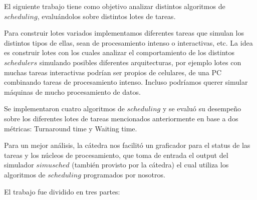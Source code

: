 El siguiente trabajo tiene como objetivo analizar distintos algoritmos de $scheduling$, evaluándolos sobre distintos lotes de tareas. 

Para construir lotes variados implementamos diferentes tareas que simulan los distintos tipos de ellas, sean de procesamiento intenso o interactivas, etc. La idea es construir lotes con los cuales analizar el comportamiento de los distintos $schedulers$ simulando posibles diferentes arquitecturas, por ejemplo lotes con muchas tareas interactivas podrían ser propios de celulares, de una PC combinando tareas de procesamiento intenso. Incluso podríamos querer simular máquinas de mucho procesamiento de datos.

Se implementaron cuatro algoritmos de $scheduling$ y se evaluó su desempeño sobre los diferentes lotes de tareas mencionados anteriormente en base a dos métricas: Turnaround time y Waiting time.

Para un mejor análisis, la cátedra nos facilitó un graficador para el status de las tareas y los núcleos de procesamiento, que toma de entrada el output del simulador $simusched$ (también provisto por la cátedra) el cual utiliza los algoritmos de $scheduling$ programados por nosotros.

El trabajo fue dividido en tres partes:
